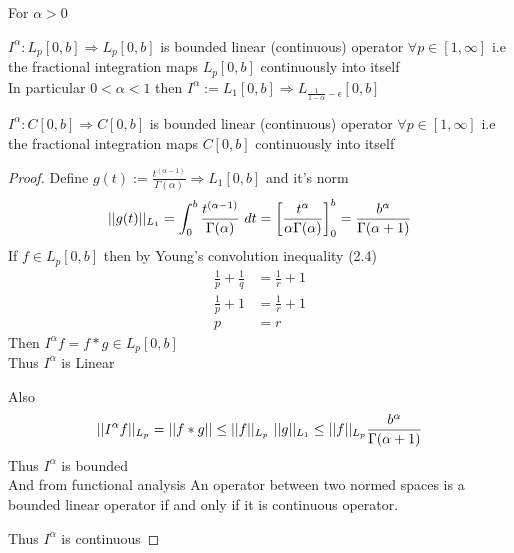\newpage
\begin{theorem}
    For $\alpha>0$ 
    
     $I^\alpha : L_p[0,b] \Longrightarrow L_p[0,b]$ is bounded linear (continuous) operator $\forall p\in[1,\infty]$ i.e 
    the fractional integration maps $L_p[0,b]$ continuously into itself
    \\
    In particular $0<\alpha<1$ then $\displaystyle I^\alpha := L_1[0,b] \Longrightarrow L_{\frac{1}{1-\alpha}-\epsilon}[0,b]$

     $I^\alpha : C[0,b] \Longrightarrow C[0,b]$ is bounded linear (continuous) operator $\forall p\in[1,\infty]$ i.e 
    the fractional integration maps $C[0,b]$ continuously into itself
\end{theorem}
\begin{proof}[Proof]
    Define $\displaystyle g(t):= \frac{t^{(\alpha-1)}}{\Gamma(\alpha)} \Longrightarrow L_1[0,b]$ and it's norm 
    \[
    ||g(t)||_{L_1} = \int_{0}^{b} \frac{t^{(\alpha-1)}}{\Gamma(\alpha)} \,\, dt = \left[\frac{t^{\alpha}}{\alpha\Gamma(\alpha)}\right]_0^b = \frac{b^\alpha}{\Gamma(\alpha+1)}
    \]
     If $f \in L_p[0,b]$ then by Young's convolution inequality (2.4)
\begin{align*}
    \frac{1}{p} + \frac{1}{q} &= \frac{1}{r} + 1
    \\
    \frac{1}{p} + 1 &= \frac{1}{r} + 1
    \\
    p &= r 
\end{align*}
Then $I^\alpha f = f * g \in L_p[0,b]$ 
\\
Thus $I^\alpha$ is Linear

Also 
\[
    ||I^\alpha f||_{L_p} = ||f*g|| \leq ||f||_{L_p} \,\, ||g||_{L_1} \leq ||f||_{L_p}\frac{b^\alpha}{\Gamma(\alpha+1)}
\]
Thus $I^\alpha$ is bounded
\\
And from functional analysis An operator between two normed spaces is a bounded linear operator 
if and only if it is continuous operator.

Thus $I^\alpha$ is continuous


\end{proof}
